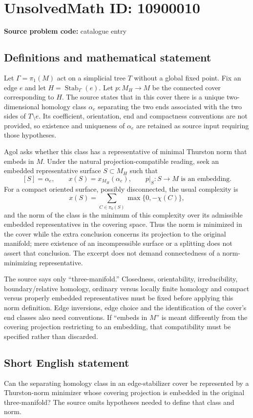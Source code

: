 \documentclass[11pt]{article}
\begin{document}
\section*{UnsolvedMath ID: 10900010}
\textbf{Source problem code:} catalogue entry
\subsection{Definitions and mathematical statement}
Let \(\Gamma=\pi_1(M)\) act on a simplicial tree \(T\) without a global fixed point. Fix an edge \(e\) and let \(H=\operatorname{Stab}_\Gamma(e)\). Let \(p:M_H\to M\) be the connected cover corresponding to \(H\). The source states that in this cover there is a unique two-dimensional homology class \(\alpha_e\) separating the two ends associated with the two sides of \(T\setminus e\). Its coefficient, orientation, end and compactness conventions are not provided, so existence and uniqueness of \(\alpha_e\) are retained as source input requiring those hypotheses.

Agol asks whether this class has a representative of minimal Thurston norm that embeds in \(M\). Under the natural projection-compatible reading, seek an embedded representative surface \(S\subset M_H\) such that
\[[S]=\alpha_e,\qquad x(S)=x_{M_H}(\alpha_e),\qquad
p|_S:S\to M\text{ is an embedding}.\]
For a compact oriented surface, possibly disconnected, the usual complexity is
\[x(S)=\sum_{C\in\pi_0(S)}\max\{0,-\chi(C)\},\]
and the norm of the class is the minimum of this complexity over its admissible embedded representatives in the covering space. Thus the norm is minimized in the cover while the extra conclusion concerns its projection to the original manifold; mere existence of an incompressible surface or a splitting does not assert that conclusion. The excerpt does not demand connectedness of a norm-minimizing representative.

The source says only ``three-manifold.'' Closedness, orientability, irreducibility, boundary/relative homology, ordinary versus locally finite homology and compact versus properly embedded representatives must be fixed before applying this norm definition. Edge inversions, edge choice and the identification of the cover's end classes also need conventions. If ``embeds in \(M\)'' is meant differently from the covering projection restricting to an embedding, that compatibility must be specified rather than discarded.
\subsection{Short English statement}
Can the separating homology class in an edge-stabilizer cover be represented by a Thurston-norm minimizer whose covering projection is embedded in the original three-manifold? The source omits hypotheses needed to define that class and norm.
\end{document}
